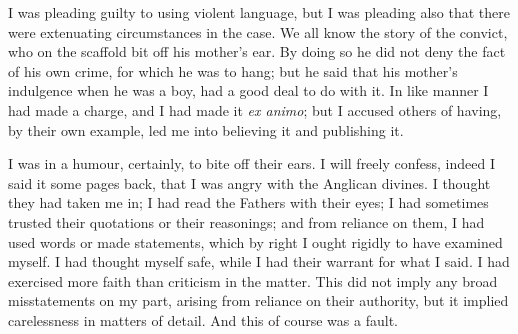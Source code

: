 I was pleading guilty to using violent language, but I was pleading also that there were extenuating circumstances in the
case. We all know the story of the convict, who on the scaffold bit off
his mother's ear. By doing so he did not deny the fact of his own crime,
for which he was to hang; but he said that his mother's indulgence when
he was a boy, had a good deal to do with it. In like manner I had made a
charge, and I had made it \emph{ex animo}; but I accused others of
having, by their own example, led me into believing it and
publishing it.

I was in a
humour, certainly,
to bite off their ears. I will freely confess, indeed I said it some pages
back, that I was angry with the Anglican divines. I thought they had
taken me in; I had read the Fathers with their eyes; I had sometimes
trusted their quotations or their reasonings; and from reliance on them,
I had used words or made statements, which by right I ought
rigidly to have examined myself. I had thought myself safe, while I
had their warrant for what I said. I had exercised more faith than
criticism in the matter. This did not imply any broad misstatements on
my part, arising from reliance on their authority, but it implied
carelessness in matters of detail. And this of course was a fault.

